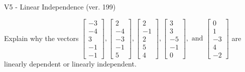 \begin{exercise}
  \begin{exerciseTitle}V5 - Linear Independence (ver. 199)\end{exerciseTitle}
  \begin{exerciseStatement}
    Explain why the vectors \(\left[\begin{array}{r}
-3 \\
-4 \\
3 \\
-1 \\
-1
\end{array}\right] , \left[\begin{array}{r}
2 \\
-4 \\
-3 \\
-1 \\
5
\end{array}\right] , \left[\begin{array}{r}
2 \\
-1 \\
2 \\
5 \\
4
\end{array}\right] , \left[\begin{array}{r}
3 \\
3 \\
-5 \\
-1 \\
0
\end{array}\right] , \text{ and } \left[\begin{array}{r}
0 \\
1 \\
-3 \\
4 \\
-2
\end{array}\right]\) are linearly dependent or linearly independent.	



\end{exerciseStatement}
\end{exercise}
